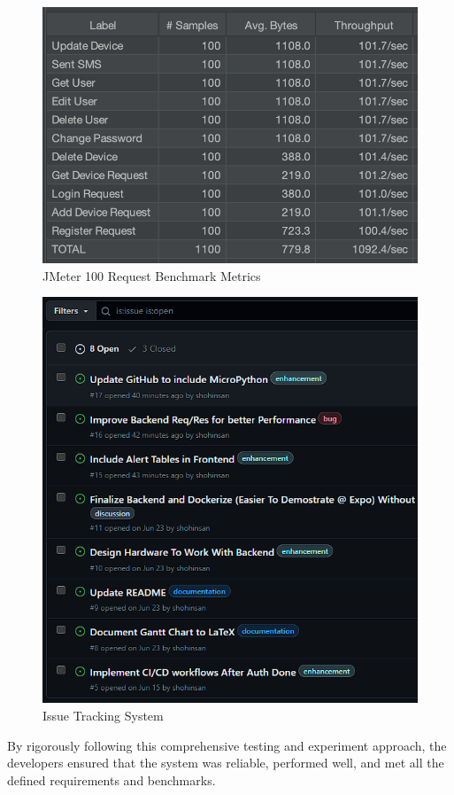 \begin{figure}[htbp]
      \centering
      \includegraphics[width=1\linewidth]{datasets/images/JMeter_100reqBenchmark.png}
      \caption{JMeter 100 Request Benchmark Metrics}
      \label{fig:figure3}
\end{figure}

\begin{figure}[htbp]
      \centering
      \includegraphics[width=1\linewidth]{datasets/images/GitHubIssues.png}
      \caption{Issue Tracking System}
      \label{fig:gitIssues}
\end{figure}

By rigorously following this comprehensive testing and experiment
approach, the developers ensured that the system was reliable,
performed well, and met all the defined requirements and benchmarks.